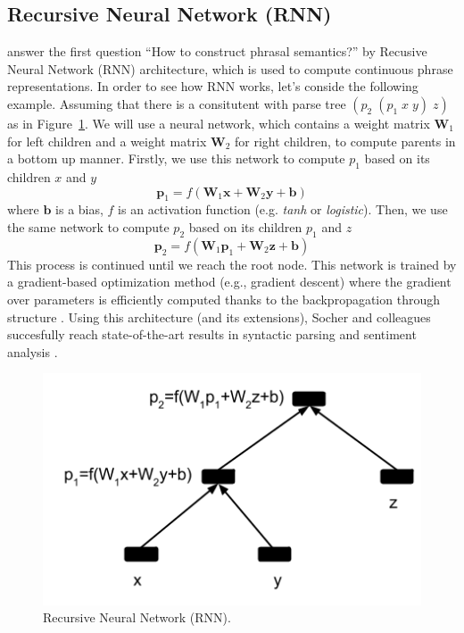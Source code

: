 \documentclass[11pt]{article}
\begin{document}
\subsection{Recursive Neural Network (RNN)}
\label{subsection rnn}
\cite{socher_learning_2010} answer the first question ``How to construct phrasal semantics?'' 
by Recusive Neural Network (RNN) architecture, 
which is used to compute continuous phrase representations. In order to see how RNN works, 
let's conside the following example. Assuming that there is a consitutent with parse
tree $(p_2 \; (p_1 \; x \; y) \; z)$ as in Figure~\ref{figure rnn}. We will use a neural network, 
which contains a weight matrix $\mathbf{W}_1$ for left children and a weight matrix $\mathbf{W}_2$ 
for right children, to compute parents in a bottom up manner. Firstly, we use this network 
to compute $p_1$ based on its children $x$ and $y$
\begin{equation}
	\mathbf{p}_1 = f(\mathbf{W}_1 \mathbf{x} + \mathbf{W}_2 \mathbf{y} + \mathbf{b})
\end{equation}
where $\mathbf{b}$ is a bias, $f$ is an activation function (e.g. \textit{tanh} or \textit{logistic}).
Then, we use the same network to compute $p_2$ based on its children $p_1$ and $z$
\begin{equation}
	\mathbf{p}_2 = f(\mathbf{W}_1 \mathbf{p}_1 + \mathbf{W}_2 \mathbf{z} + \mathbf{b})
\end{equation}
This process is continued until we reach the root node.  This network is trained by 
a gradient-based optimization method (e.g., gradient descent) where the gradient 
over parameters is efficiently computed thanks to the backpropagation through structure
\cite{goller_learning_1996}. Using this architecture 
(and its extensions), Socher and colleagues succesfully reach 
state-of-the-art results in syntactic parsing \cite{socher2013parsing} and 
sentiment analysis \cite{socher2013recursive}. 
\begin{figure}[h!]
	\center
	\includegraphics[scale=0.5]{RNN.png}
	\caption{Recursive Neural Network (RNN).}
	\label{figure rnn}
\end{figure}
\end{document}
